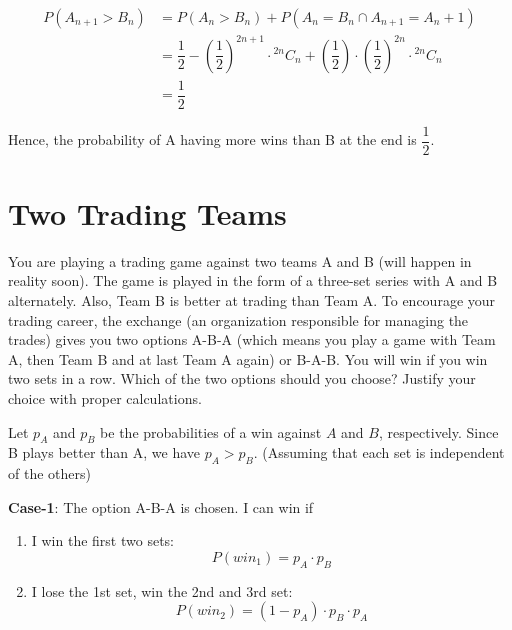 \documentclass{article}
\newcommand*{\Comb}[2]{{}^{#1}C_{#2}}
\begin{document}
\begin{equation}
\begin{aligned}
    P(A_{n+1}>B_n) &= P(A_n>B_n) + P(A_n=B_n \cap A_{n+1}=A_n+1) \\
    &= \dfrac{1}{2} - \left(\dfrac{1}{2}\right)^{2n+1}\cdot \Comb{2n}{n} + \left(\dfrac{1}{2}\right)\cdot \left(\dfrac{1}{2}\right)^{2n}\cdot \Comb{2n}{n} \\
    &= \dfrac{1}{2}
\end{aligned}
\end{equation}

Hence, the probability of A having more wins than B at the end is $\dfrac{1}{2}$.

\setcounter{equation}{0}

\section{Two Trading Teams}

\begin{tcolorbox}
    You are playing a trading game against two teams A and B (will happen in reality soon). The
    game is played in the form of a three-set series with A and B alternately. Also, Team B is better at
    trading than Team A. To encourage your trading career, the exchange (an organization responsible
    for managing the trades) gives you two options A-B-A (which means you play a game with Team A, then Team B and at last Team A again) or B-A-B. You will win if you win two sets in a row.
    Which of the two options should you choose? Justify your choice with proper calculations.
\end{tcolorbox}

Let $p_A$ and $p_B$ be the probabilities of a win against $A$ and $B$, respectively. Since B plays better than A, we have $p_A > p_B$. (Assuming that each set is independent of the others)

\medskip\textbf{Case-1}: The option A-B-A is chosen. I can win if
\begin{enumerate}
    \item I win the first two sets:
    \begin{equation*}
        P(win_1) = p_A\cdot p_B
    \end{equation*}
    
    \item I lose the 1st set, win the 2nd and 3rd set:
    \begin{equation*}
        P(win_2) = (1-p_A)\cdot p_B\cdot p_A
    \end{equation*}
\end{enumerate}
\end{document}
